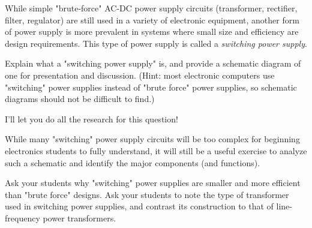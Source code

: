 

While simple "brute-force" AC-DC power supply circuits (transformer, rectifier, filter, regulator) are still used in a variety of electronic equipment, another form of power supply is more prevalent in systems where small size and efficiency are design requirements.  This type of power supply is called a {\it switching power supply}.

Explain what a "switching power supply" is, and provide a schematic diagram of one for presentation and discussion.  (Hint: most electronic computers use "switching" power supplies instead of "brute force" power supplies, so schematic diagrams should not be difficult to find.)







I'll let you do all the research for this question!







While many "switching" power supply circuits will be too complex for beginning electronics students to fully understand, it will still be a useful exercise to analyze such a schematic and identify the major components (and functions).

Ask your students why "switching" power supplies are smaller and more efficient than "brute force" designs.  Ask your students to note the type of transformer used in switching power supplies, and contrast its construction to that of line-frequency power transformers.





